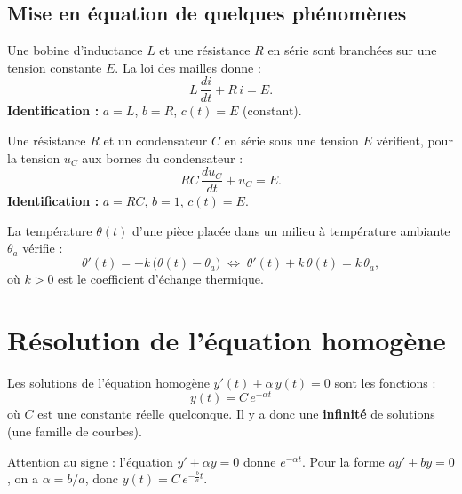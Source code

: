 \documentclass[a4paper,11pt]{article}
\begin{document}
\subsection{Mise en équation de quelques phénomènes}

\begin{appliindus}
Une bobine d'inductance $L$ et une résistance $R$ en série sont branchées sur une tension constante $E$. La loi des mailles donne :
\[
L\,\frac{di}{dt} + R\,i = E.
\]
\textbf{Identification :} $a = L$, $b = R$, $c(t) = E$ (constant).
\end{appliindus}

\begin{appliindus}
Une résistance $R$ et un condensateur $C$ en série sous une tension $E$ vérifient, pour la tension $u_C$ aux bornes du condensateur :
\[
RC\,\frac{du_C}{dt} + u_C = E.
\]
\textbf{Identification :} $a = RC$, $b = 1$, $c(t) = E$.
\end{appliindus}

\begin{appliindus}
La température $\theta(t)$ d'une pièce placée dans un milieu à température ambiante $\theta_a$ vérifie :
\[
\theta'(t) = -k\,\big(\theta(t) - \theta_a\big) \;\Longleftrightarrow\; \theta'(t) + k\,\theta(t) = k\,\theta_a,
\]
où $k > 0$ est le coefficient d'échange thermique.
\end{appliindus}

\newpage
\section{Résolution de l'équation homogène}

\begin{theoreme}
Les solutions de l'équation homogène $y'(t) + \alpha\,y(t) = 0$ sont les fonctions :
\[
\boxed{y(t) = C\,e^{-\alpha t}}
\]
où $C$ est une constante réelle quelconque. Il y a donc une \textbf{infinité} de solutions (une famille de courbes).
\end{theoreme}

\begin{remarque}
Attention au signe : l'équation $y' + \alpha y = 0$ donne $e^{-\alpha t}$. Pour la forme $a y' + b y = 0$, on a $\alpha = b/a$, donc $y(t) = C\,e^{-\frac{b}{a} t}$.
\end{remarque}
\end{document}
